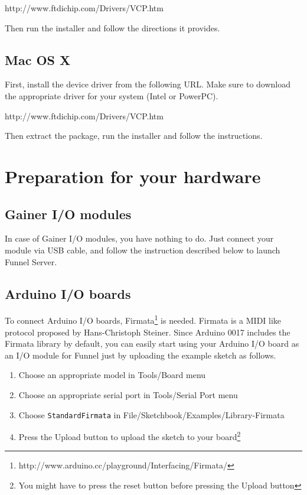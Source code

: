 \documentclass[9pt]{jsarticle}
\begin{document}
\vspace{8pt}
http://www.ftdichip.com/Drivers/VCP.htm
\vspace{8pt}

Then run the installer and follow the directions it provides.

\subsection{Mac OS X}
First, install the device driver from the following URL. Make sure to download the appropriate driver for your system (Intel or PowerPC).

\vspace{8pt}
http://www.ftdichip.com/Drivers/VCP.htm
\vspace{8pt}

Then extract the package, run the installer and follow the instructions.

\section{Preparation for your hardware}
\subsection{Gainer I/O modules}
In case of Gainer I/O modules, you have nothing to do. Just connect your module via USB cable, and follow the instruction described below to launch Funnel Server.

\subsection{Arduino I/O boards}
\label{uploading_firmata_arduino}
To connect Arduino I/O boards, Firmata\footnote{http://www.arduino.cc/playground/Interfacing/Firmata/} is needed. Firmata is a MIDI like protocol proposed by Hans-Christoph Steiner. Since Arduino 0017 includes the Firmata library by default, you can easily start using your Arduino I/O board as an I/O module for Funnel just by uploading the example sketch as follows.

\begin{enumerate}
\item Choose an appropriate model in Tools/Board menu
\item Choose an appropriate serial port in Tools/Serial Port menu
\item Choose \texttt{StandardFirmata} in File/Sketchbook/Examples/Library-Firmata
\item Press the Upload button to upload the sketch to your board\footnote{You might have to press the reset button before pressing the Upload button}
\end{enumerate}
\end{document}
